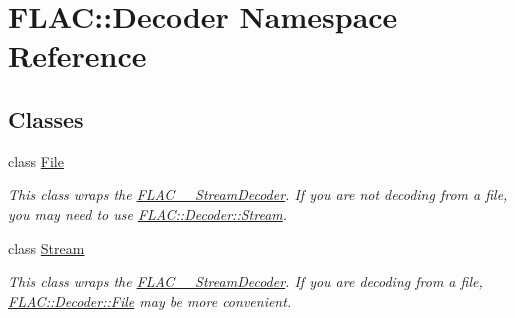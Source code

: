 \hypertarget{namespace_f_l_a_c_1_1_decoder}{}\section{F\+L\+AC\+:\+:Decoder Namespace Reference}
\label{namespace_f_l_a_c_1_1_decoder}
\subsection*{Classes}
\begin{DoxyCompactItemize}
\item 
class \hyperlink{class_f_l_a_c_1_1_decoder_1_1_file}{File}
\begin{DoxyCompactList}\small\item\em This class wraps the \hyperlink{struct_f_l_a_c_____stream_decoder}{F\+L\+A\+C\+\_\+\+\_\+\+Stream\+Decoder}. If you are not decoding from a file, you may need to use \hyperlink{class_f_l_a_c_1_1_decoder_1_1_stream}{F\+L\+A\+C\+::\+Decoder\+::\+Stream}. \end{DoxyCompactList}\item 
class \hyperlink{class_f_l_a_c_1_1_decoder_1_1_stream}{Stream}
\begin{DoxyCompactList}\small\item\em This class wraps the \hyperlink{struct_f_l_a_c_____stream_decoder}{F\+L\+A\+C\+\_\+\+\_\+\+Stream\+Decoder}. If you are decoding from a file, \hyperlink{class_f_l_a_c_1_1_decoder_1_1_file}{F\+L\+A\+C\+::\+Decoder\+::\+File} may be more convenient. \end{DoxyCompactList}\end{DoxyCompactItemize}
